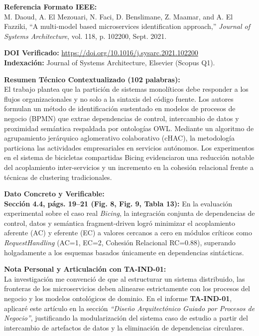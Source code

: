 \documentclass[11pt,a4paper]{article}
\begin{document}
\noindent\textbf{Referencia Formato IEEE:}\\
\nocite{Daoud2021}\cite{Daoud2021} M. Daoud, A. {El Mezouari}, N. Faci, D. Benslimane, Z. Maamar, and A. {El Fazziki}, ``A multi-model based microservices identification approach,'' \textit{Journal of Systems Architecture}, vol. 118, p. 102200, Sept. 2021.

\vspace{1.5mm}
\noindent\textbf{DOI Verificado:} \url{https://doi.org/10.1016/j.sysarc.2021.102200}\\
\textbf{Indexación:} Journal of Systems Architecture, Elsevier (Scopus Q1).

\vspace{2mm}
\noindent\textbf{Resumen Técnico Contextualizado (102 palabras):}\\
El trabajo plantea que la partición de sistemas monolíticos debe responder a los flujos organizacionales y no solo a la sintaxis del código fuente. Los autores formulan un método de identificación sustentado en modelos de procesos de negocio (BPMN) que extrae dependencias de control, intercambio de datos y proximidad semántica respaldada por ontologías OWL. Mediante un algoritmo de agrupamiento jerárquico aglomerativo colaborativo (cHAC), la metodología particiona las actividades empresariales en servicios autónomos. Los experimentos en el sistema de bicicletas compartidas Bicing evidenciaron una reducción notable del acoplamiento inter-servicios y un incremento en la cohesión relacional frente a técnicas de clustering tradicionales.

\newpage
\noindent\textbf{Dato Concreto y Verificable:}\\
\textbf{Sección 4.4, págs. 19--21 (Fig. 8, Fig. 9, Tabla 13):} En la evaluación experimental sobre el caso real \textit{Bicing}, la integración conjunta de dependencias de control, datos y semántica fragment-driven logró minimizar el acoplamiento aferente (AC) y eferente (EC) a valores cercanos a cero en módulos críticos como \textit{RequestHandling} (AC=1, EC=2, Cohesión Relacional RC=0.88), superando holgadamente a los esquemas basados únicamente en dependencias sintácticas.

\vspace{2mm}
\noindent\textbf{Nota Personal y Articulación con TA-IND-01:}\\
La investigación me convenció de que al estructurar un sistema distribuido, las fronteras de los microservicios deben alinearse estrictamente con los procesos del negocio y los modelos ontológicos de dominio. En el informe \textbf{TA-IND-01}, aplicaré este artículo en la sección \textit{``Diseño Arquitectónico Guiado por Procesos de Negocio''}, justificando la modularización del sistema caso de estudio a partir del intercambio de artefactos de datos y la eliminación de dependencias circulares.
\end{document}
